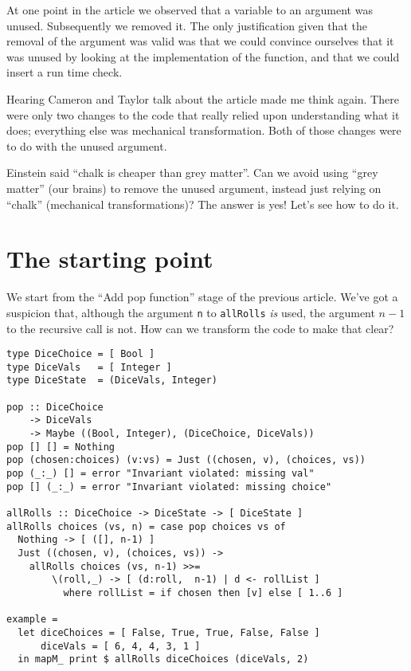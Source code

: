 At one point in the article we observed that a variable to an argument was unused. Subsequently we removed it. The only justification given that the removal of the argument was valid was that we could convince ourselves that it was unused by looking at the implementation of the function, and that we could insert a run time check.

Hearing Cameron and Taylor talk about the article made me think again. There were only two changes to the code that really relied upon understanding what it does; everything else was mechanical transformation. Both of those changes were to do with the unused argument.

Einstein said ``chalk is cheaper than grey matter''. Can we avoid using ``grey matter'' (our brains) to remove the unused argument, instead just relying on ``chalk'' (mechanical transformations)? The answer is yes! Let's see how to do it.

\section{The starting point}


We start from the ``Add pop function'' stage of the previous article. We've got a suspicion that, although the argument \texttt{n} to \texttt{allRolls} \textit{is} used, the argument $n-1$ to the recursive call is not. How can we transform the code to make that clear?

\begin{verbatim}
type DiceChoice = [ Bool ]
type DiceVals   = [ Integer ]
type DiceState  = (DiceVals, Integer)

pop :: DiceChoice
    -> DiceVals
    -> Maybe ((Bool, Integer), (DiceChoice, DiceVals))
pop [] [] = Nothing
pop (chosen:choices) (v:vs) = Just ((chosen, v), (choices, vs))
pop (_:_) [] = error "Invariant violated: missing val"
pop [] (_:_) = error "Invariant violated: missing choice"

allRolls :: DiceChoice -> DiceState -> [ DiceState ]
allRolls choices (vs, n) = case pop choices vs of
  Nothing -> [ ([], n-1) ]
  Just ((chosen, v), (choices, vs)) ->
    allRolls choices (vs, n-1) >>=
        \(roll,_) -> [ (d:roll,  n-1) | d <- rollList ]
          where rollList = if chosen then [v] else [ 1..6 ]

example =
  let diceChoices = [ False, True, True, False, False ]
      diceVals = [ 6, 4, 4, 3, 1 ]
  in mapM_ print $ allRolls diceChoices (diceVals, 2)
\end{verbatim}

